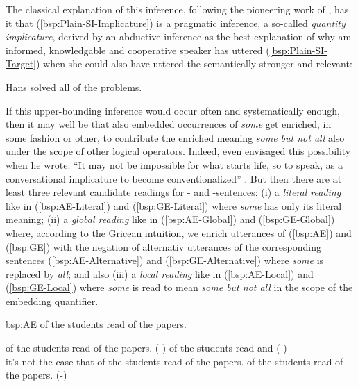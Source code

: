 \documentclass[fleqn,reqno,10pt,draft]{article}
\newcommand{\lit}{\acro{lit}}
\newcommand{\glb}{\acro{glb}}
\newcommand{\loc}{\acro{loc}}
\newcommand{\as}{\acro{as}}
\renewcommand{\es}{\acro{es}}
\newcommand{\mymark}[1]{{\color{mycol}{#1}}}
\begin{document}
\noindent The classical explanation of this inference, following the
pioneering work of \citet{Grice1975:Logic-and-Conve}, has it that
(\ref{bsp:Plain-SI-Implicature}) is a pragmatic inference, a so-called
\emph{quantity implicature}, derived by an abductive inference as the
best explanation of why am informed, knowledgable and cooperative
speaker has uttered (\ref{bsp:Plain-SI-Target}) when she could also
have uttered the semantically stronger and relevant:

\begin{exe}
    \begin{xlist}
       \label{bsp:Plain-SI-Alternative} Hans solved all of the problems.
    \end{xlist}
\end{exe}

\noindent If this upper-bounding inference would occur often and
systematically enough, then it may well be that also embedded
occurrences of \emph{some} get enriched, in some fashion or other, to
contribute the enriched meaning \emph{some but not all} also under the
scope of other logical operators. Indeed, even
\citeauthor{Grice1975:Logic-and-Conve} envisaged this possibility when
he wrote: ``It may not be impossible for what starts life, so to
speak, as a conversational implicature to become conventionalized''
\citep[p.58]{Grice1975:Logic-and-Conve}. But then there are at least
three relevant candidate readings for \as- and \es-sentences: (i) a
\emph{literal reading} like in (\ref{bsp:AE-Literal}) and
(\ref{bsp:GE-Literal}) where \emph{some} has only its literal meaning;
(ii) a \emph{global reading} like in (\ref{bsp:AE-Global}) and
(\ref{bsp:GE-Global}) where, according to the Gricean intuition, we
enrich utterances of (\ref{bsp:AE}) and (\ref{bsp:GE}) with the
negation of alternativ utterances of the corresponding sentences
(\ref{bsp:AE-Alternative}) and (\ref{bsp:GE-Alternative}) where
\emph{some} is replaced by \emph{all}; and also (iii) a \emph{local
  reading} like in (\ref{bsp:AE-Local}) and (\ref{bsp:GE-Local}) where
\emph{some} is read to mean \emph{some but not all} in the scope of
the embedding quantifier.


\begin{exer}{bsp:AE}
  \ex \mymark{All} of the students read {\mymark{some}} of the
  papers. 

  \begin{xlist}
  \ex \label{bsp:AE-Literal} \mymark{All} of the students read
    {\mymark{some and maybe all}} of the papers. \hfill (\as-\lit)
  \ex \label{bsp:AE-Global}
    \mymark{All} of the students read \mymark{some and maybe all} 
    and  \hfill (\as-\glb)\\
    it's not the case that \mymark{all} of the students read \mymark{all} of the papers.
  \ex \label{bsp:AE-Local}
    \mymark{All} of the students read {\mymark{some  but not all}} of the
    papers. \hfill (\as-\loc)
  \end{xlist}
\end{exer}
\end{document}
